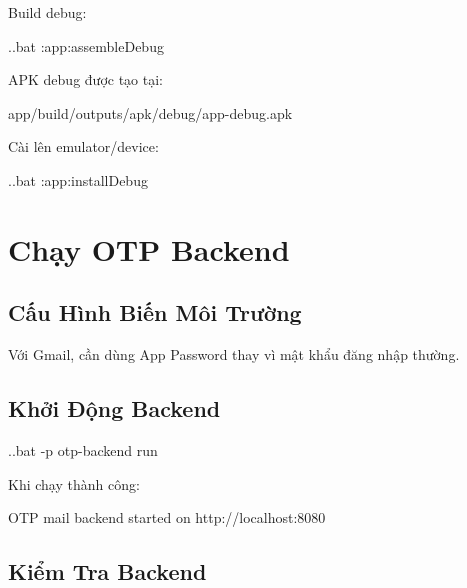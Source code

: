 \documentclass[12pt,a4paper]{report}
\begin{document}
Build debug:

\begin{CodeBlock}
.\gradlew.bat :app:assembleDebug
\end{CodeBlock}

APK debug được tạo tại:

\begin{CodeBlock}
app/build/outputs/apk/debug/app-debug.apk
\end{CodeBlock}

Cài lên emulator/device:

\begin{CodeBlock}
.\gradlew.bat :app:installDebug
\end{CodeBlock}

\section{Chạy OTP Backend}

\subsection{Cấu Hình Biến Môi Trường}

Với Gmail, cần dùng App Password thay vì mật khẩu đăng nhập thường.


\subsection{Khởi Động Backend}

\begin{CodeBlock}
.\gradlew.bat -p otp-backend run
\end{CodeBlock}

Khi chạy thành công:

\begin{CodeBlock}
OTP mail backend started on http://localhost:8080
\end{CodeBlock}

\subsection{Kiểm Tra Backend}
\end{document}
